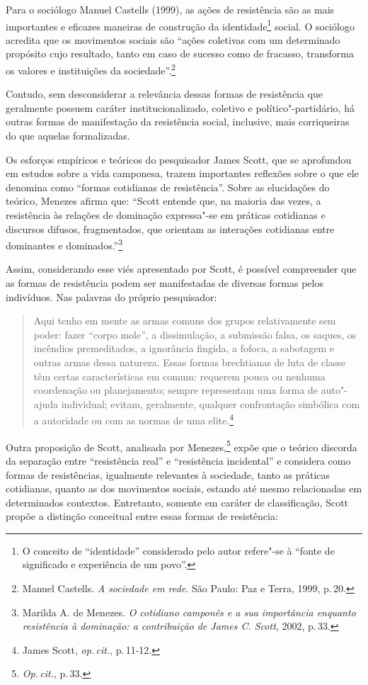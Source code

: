 Para o sociólogo Manuel Castells (1999), as ações de resistência são as
mais importantes e eficazes maneiras de construção da
identidade\footnote{O conceito de ``identidade'' considerado pelo autor
  refere"-se à ``fonte de significado e experiência de um povo''.} social.
O sociólogo acredita que os movimentos sociais são ``ações coletivas com
um determinado propósito cujo resultado, tanto em caso de sucesso como
de fracasso, transforma os valores e instituições da sociedade''.\footnote{Manuel Castells. \emph{A sociedade em rede.} São Paulo: Paz e Terra, 1999, p.\,20.}

Contudo, sem desconsiderar a relevância dessas formas de resistência que
geralmente possuem caráter institucionalizado, coletivo e
político"-partidário, há outras formas de manifestação da resistência
social, inclusive, mais corriqueiras do que aquelas formalizadas.

Os esforços empíricos e teóricos do pesquisador James Scott, que se
aprofundou em estudos sobre a vida camponesa, trazem importantes
reflexões sobre o que ele denomina como ``formas cotidianas de
resistência''. Sobre as elucidações do teórico, Menezes
afirma que: ``Scott entende que, na maioria das vezes, a resistência às
relações de dominação expressa"-se em práticas cotidianas e discursos
difusos, fragmentados, que orientam as interações cotidianas entre
dominantes e dominados.''\footnote{Marilda A. de Menezes. \emph{O cotidiano camponês e a sua importância enquanto resistência à dominação: a contribuição de James C. Scott}, 2002, p.\,33.}

Assim, considerando esse viés apresentado por Scott, é possível
compreender que as formas de resistência podem ser manifestadas de
diversas formas pelos indivíduos. Nas palavras do próprio pesquisador:

\begin{quote}
Aqui tenho em mente as armas comuns dos grupos relativamente sem poder:
fazer ``corpo mole'', a dissimulação, a submissão falsa, os saques, os
incêndios premeditados, a ignorância fingida, a fofoca, a sabotagem e
outras armas dessa natureza. Essas formas brechtianas de luta de classe
têm certas características em comum: requerem pouca ou nenhuma
coordenação ou planejamento; sempre representam uma forma de auto"-ajuda
individual; evitam, geralmente, qualquer confrontação simbólica com a
autoridade ou com as normas de uma elite.\footnote{James Scott, \textit{op.\,cit.}, p.\,11-12.}
\end{quote}

Outra proposição de Scott, analisada por Menezes,\footnote{\textit{Op.\,cit.}, p.\,33.} expõe que o
teórico discorda da separação entre ``resistência real'' e ``resistência
incidental'' e considera como formas de resistências, igualmente
relevantes à sociedade, tanto as práticas cotidianas, quanto as dos
movimentos sociais, estando até mesmo relacionadas em determinados
contextos. Entretanto, somente em caráter de classificação, Scott propõe a distinção conceitual entre essas
formas de resistência:

